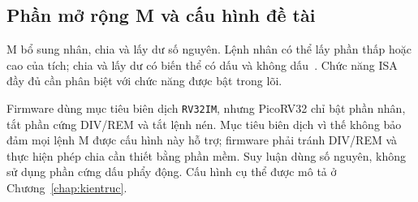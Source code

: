 \subsection{Phần mở rộng M và cấu hình đề tài}
M bổ sung nhân, chia và lấy dư số nguyên. Lệnh nhân có thể lấy phần thấp hoặc cao của tích; chia và lấy dư có biến thể có dấu và không dấu~\cite{waterman2014risc}. Chức năng ISA đầy đủ cần phân biệt với chức năng được bật trong lõi.

Firmware dùng mục tiêu biên dịch \texttt{RV32IM}, nhưng PicoRV32 chỉ bật phần nhân, tắt phần cứng DIV/REM và tắt lệnh nén. Mục tiêu biên dịch vì thế không bảo đảm mọi lệnh M được cấu hình này hỗ trợ; firmware phải tránh DIV/REM và thực hiện phép chia cần thiết bằng phần mềm. Suy luận dùng số nguyên, không sử dụng phần cứng dấu phẩy động. Cấu hình cụ thể được mô tả ở Chương~\ref{chap:kientruc}.

